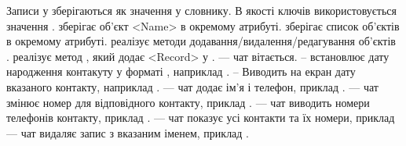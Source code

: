 \markdownRendererDocumentBegin
{}\markdownRendererInterblockSeparator
{}\markdownRendererUlBeginTight
\markdownRendererUlItem Записи  у  зберігаються як значення у словнику. В якості ключів використовується значення .\markdownRendererUlItemEnd 
\markdownRendererUlItem {} зберігає об'єкт <Name> в окремому атрибуті.\markdownRendererUlItemEnd 
\markdownRendererUlItem {} зберігає список об'єктів  в окремому атрибуті.\markdownRendererUlItemEnd 
\markdownRendererUlItem {} реалізує методи додавання/видалення/редагування об'єктів .\markdownRendererUlItemEnd 
\markdownRendererUlItem {} реалізує метод , який додає <Record> у .\markdownRendererUlItemEnd 
\markdownRendererUlEndTight \markdownRendererInterblockSeparator
{}\markdownRendererInterblockSeparator
{}\markdownRendererUlBeginTight
\markdownRendererUlItem {} --- чат вітається.\markdownRendererUlItemEnd 
\markdownRendererUlItem {} -- встановлює дату народження контакуту у форматі , наприклад .\markdownRendererUlItemEnd 
\markdownRendererUlItem {} -- Виводить на екран дату вказаного контакту, наприклад .\markdownRendererUlItemEnd 
\markdownRendererUlItem {} --- чат додає ім'я і телефон, приклад .\markdownRendererUlItemEnd 
\markdownRendererUlItem {} --- чат змінює номер для відповідного контакту, приклад .\markdownRendererUlItemEnd 
\markdownRendererUlItem {} --- чат виводить номери телефонів контакту, приклад .\markdownRendererUlItemEnd 
\markdownRendererUlItem {}--- чат показує усі контакти та їх номери, приклад \markdownRendererUlItemEnd 
\markdownRendererUlItem {} --- чат видаляє запис з вказаним іменем, приклад .\markdownRendererUlItemEnd 
